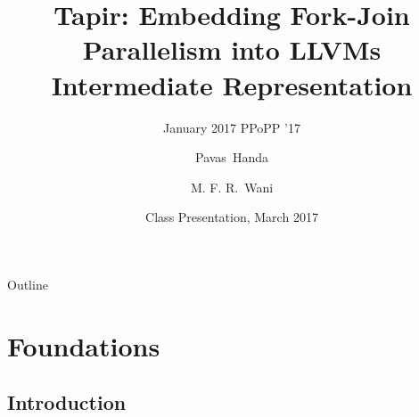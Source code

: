 \documentclass{beamer}
\title[TAPIR]{Tapir: Embedding Fork-Join Parallelism
into LLVM\textquotesingle s Intermediate Representation}
\subtitle{January 2017 PPoPP '17}
\author{Pavas~Handa \and M. F. R.~Wani}
\institute[IIIT-D] %
{
  Department of Computer Science \\
  IIIT-D
}
\date[FPP -- March 2017]{Class Presentation, March 2017}
\begin{document}
\begin{frame}
  \titlepage
\end{frame}

\begin{frame}{Outline}
  \tableofcontents
\end{frame}

\section{Foundations}

\subsection{Introduction}
\end{document}
